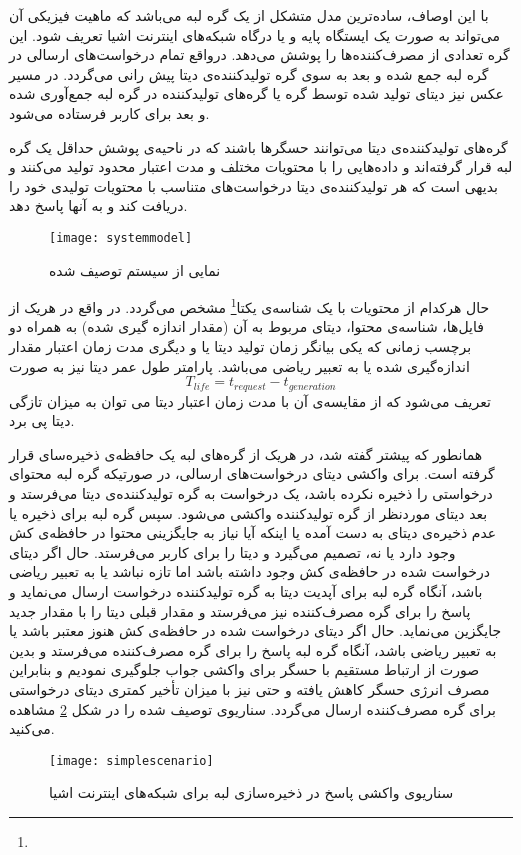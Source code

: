 با این اوصاف، ساده‌ترین مدل متشکل از یک گره لبه می‌باشد که ماهیت فیزیکی آن می‌تواند به صورت یک ایستگاه پایه و یا درگاه شبکه‌های اینترنت اشیا تعریف شود. این گره تعدادی از مصرف‌کننده‌ها را پوشش می‌دهد. درواقع تمام درخواست‌های ارسالی در گره لبه جمع شده و بعد به سوی گره تولیدکننده‌ی دیتا پیش رانی می‌گردد. در مسیر عکس نیز دیتای تولید شده توسط گره یا گره‌های تولیدکننده در گره لبه جمع‌آوری شده و بعد برای کاربر فرستاده می‌شود.

گره‌های تولیدکننده‌ی دیتا می‌توانند حسگرها باشند که در ناحیه‌ی پوشش حداقل یک گره لبه قرار گرفته‌اند و داده‌هایی را با محتویات مختلف و مدت اعتبار محدود تولید می‌کنند و بدیهی است که هر تولیدکننده‌ی دیتا درخواست‌های متناسب با محتویات تولیدی خود را دریافت کند و به آنها پاسخ دهد.

\begin{figure}[ht]
	\centerline{\texttt{[image: systemmodel]}}
	\caption{نمایی از سیستم توصیف شده \cite{yao2020caching}}
	\label{fig:systemmodel}
\end{figure}

حال هرکدام از محتویات با یک شناسه‌ی یکتا\footnote{} مشخص می‌گردد. در واقع در هریک از فایل‌ها، شناسه‌ی محتوا، دیتای مربوط به آن (مقدار اندازه گیری شده) به همراه دو برچسب زمانی که یکی بیانگر زمان تولید دیتا یا  و دیگری مدت زمان اعتبار مقدار اندازه‌گیری شده یا به تعبیر ریاضی  می‌باشد. پارامتر طول عمر دیتا نیز به صورت 
\begin{equation}\label{eq3}
	T_{life} = t_{request} - t_{generation}
\end{equation}
 تعریف می‌شود که از مقایسه‌ی آن با مدت زمان اعتبار دیتا می توان به میزان تازگی دیتا پی برد.

همانطور که پیشتر گفته شد، در هریک از گره‌های لبه یک حافظه‌ی ذخیره‌سای قرار گرفته است. برای واکشی دیتای درخواست‌های ارسالی، در صورتیکه گره لبه محتوای درخواستی را ذخیره نکرده باشد، یک درخواست به گره تولیدکننده‌ی دیتا می‌فرستد و بعد دیتای موردنظر از گره تولیدکننده واکشی می‌شود. سپس گره لبه برای ذخیره یا عدم ذخیره‌ی دیتای به دست آمده یا اینکه آیا نیاز به جایگزینی محتوا در حافظه‌ی کش وجود دارد یا نه، تصمیم می‌گیرد و دیتا را برای کاربر می‌فرستد. حال اگر دیتای درخواست شده در حافظه‌ی کش وجود داشته باشد اما تازه نباشد یا به تعبیر ریاضی  باشد، آنگاه گره لبه برای آپدیت دیتا به گره تولیدکننده درخواست ارسال می‌نماید و پاسخ را برای گره مصرف‌کننده نیز می‌فرستد و مقدار قبلی دیتا را با مقدار جدید جایگزین می‌نماید. حال اگر دیتای درخواست شده در حافظه‌ی کش هنوز معتبر باشد یا به تعبیر ریاضی  باشد، آنگاه گره لبه پاسخ را برای گره مصرف‌کننده می‌فرستد و بدین صورت از ارتباط مستقیم با حسگر برای واکشی جواب جلوگیری نمودیم و بنابراین مصرف انرژی حسگر کاهش یافته و حتی نیز با میزان تأخیر کمتری دیتای درخواستی برای گره مصرف‌کننده ارسال می‌گردد. سناریوی توصیف شده را در شکل \ref{fig:simplescenario} مشاهده می‌کنید.
\begin{figure}[ht]
	\centerline{\texttt{[image: simplescenario]}}
	\caption{سناریوی واکشی پاسخ در ذخیره‌سازی لبه برای شبکه‌های اینترنت اشیا\cite{cachingtransientdata2018}}
	\label{fig:simplescenario}
\end{figure}

